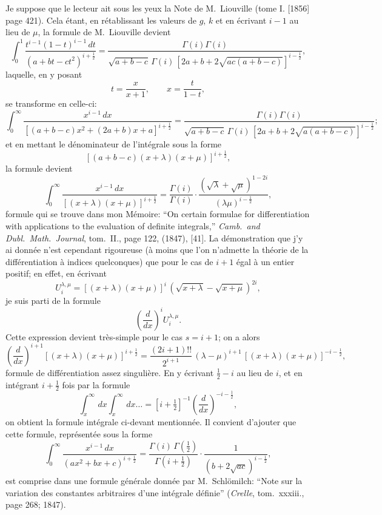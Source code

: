 \documentclass[11pt,a4paper]{book}
\theoremstyle{plain}
\begin{document}
Je suppose que le lecteur ait sous les yeux la Note de M.~Liouville (tome I. [1856] page 421). Cela \'{e}tant, en r\'{e}tablissant les valeurs de $g$, $k$ et en \'{e}crivant $i-1$ au lieu de $\mu$, la formule de M.~Liouville devient
\begin{equation}
\int_0^1\frac{t^{i-1}(1-t)^{i-1}\,dt}{(a+bt-ct^2)^{i+\frac{1}{2}}}
=\frac{\Gamma(i)\Gamma(i)}{\sqrt{a+b-c}\,\Gamma(i)\,[2a+b+2\sqrt{ac(a+b-c)}]^{i-\frac{1}{2}}},
\end{equation}
laquelle, en y posant
\[
t=\frac{x}{x+1},\qquad x=\frac{t}{1-t},
\]
se transforme en celle-ci:
\begin{equation}
\int_0^{\infty}\frac{x^{i-1}\,dx}{[(a+b-c)x^2+(2a+b)x+a]^{i+\frac{1}{2}}}
=\frac{\Gamma(i)\Gamma(i)}{\sqrt{a+b-c}\,\Gamma(i)\,[2a+b+2\sqrt{a(a+b-c)}]^{i-\frac{1}{2}}};
\end{equation}
et en mettant le d\'{e}nominateur de l'int\'{e}grale sous la forme
\[
[(a+b-c)(x+\lambda)(x+\mu)]^{i+\frac{1}{2}},
\]
la formule devient
\begin{equation}
\int_0^{\infty}\frac{x^{i-1}\,dx}{[(x+\lambda)(x+\mu)]^{i+\frac{1}{2}}}
=\frac{\Gamma(i)}{\Gamma(i)}\cdot\frac{(\sqrt{\lambda}+\sqrt{\mu})^{1-2i}}{(\lambda\mu)^{i-\frac{1}{2}}},
\end{equation}
formule qui se trouve dans mon M\'{e}moire: ``On certain formulae for differentiation with applications to the evaluation of definite integrals,'' \textit{Camb.\ and Dubl.\ Math.\ Journal}, tom.~II., page 122, (1847), [41]. La d\'{e}monstration que j'y ai donn\'{e}e n'est cependant rigoureuse (\`{a} moins que l'on n'admette la th\'{e}orie de la diff\'{e}rentiation \`{a} indices quelconques) que pour le cas de $i+1$ \'{e}gal \`{a} un entier positif; en effet, en \'{e}crivant
\[
U^{\lambda,\mu}_i=[(x+\lambda)(x+\mu)]^{i}\,(\sqrt{x+\lambda}-\sqrt{x+\mu})^{2i},
\]
je suis parti de la formule
\[
\left(\frac{d}{dx}\right)^i U^{\lambda,\mu}_i.
\]
Cette expression devient tr\`{e}s-simple pour le cas $s=i+1$; on a alors
\begin{equation}
\left(\frac{d}{dx}\right)^{i+1}[(x+\lambda)(x+\mu)]^{i+\frac{1}{2}}
=\frac{(2i+1)!!}{2^{i+1}}\,(\lambda-\mu)^{i+1}\,[(x+\lambda)(x+\mu)]^{-i-\frac{1}{2}},
\end{equation}
formule de diff\'{e}rentiation assez singuli\`{e}re. En y \'{e}crivant $\frac{1}{2}-i$ au lieu de $i$, et en int\'{e}grant $i+\frac{1}{2}$ fois par la formule
\[
\int^{\infty}_x\,dx\int^{\infty}_x\,dx\ldots=[i+\tfrac{1}{2}]^{-1}\left(\frac{d}{dx}\right)^{-i-\frac{1}{2}},
\]
on obtient la formule int\'{e}grale ci-devant mentionn\'{e}e. Il convient d'ajouter que cette formule, repr\'{e}sent\'{e}e sous la forme
\begin{equation}
\int_0^{\infty}\frac{x^{i-1}\,dx}{(ax^2+bx+c)^{i+\frac{1}{2}}}
=\frac{\Gamma(i)\,\Gamma(\frac{1}{2})}{\Gamma(i+\frac{1}{2})}\cdot\frac{1}{(b+2\sqrt{ac})^{i-\frac{1}{2}}},
\end{equation}
est comprise dans une formule g\'{e}n\'{e}rale donn\'{e}e par M.~Schl\"{o}milch: ``Note sur la variation des constantes arbitraires d'une int\'{e}grale d\'{e}finie'' (\textit{Crelle}, tom.~xxxiii., page 268; 1847).
\end{document}
